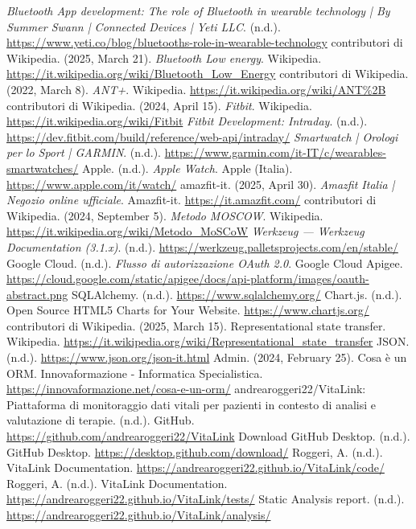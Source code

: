 \documentclass[12pt,a4paper,oneside]{report}
\begin{document}
\begin{thebibliography}{99}
     \textit{Bluetooth App development: The role of Bluetooth in wearable technology | By Summer Swann | Connected Devices | Yeti LLC}. (n.d.). \url{https://www.yeti.co/blog/bluetooths-role-in-wearable-technology}
     contributori di Wikipedia. (2025, March 21). \textit{Bluetooth Low energy}. Wikipedia. \url{https://it.wikipedia.org/wiki/Bluetooth_Low_Energy}
     contributori di Wikipedia. (2022, March 8). \textit{ANT+}. Wikipedia. \url{https://it.wikipedia.org/wiki/ANT%2B}
     contributori di Wikipedia. (2024, April 15). \textit{Fitbit}. Wikipedia. \url{https://it.wikipedia.org/wiki/Fitbit}
     \textit{Fitbit Development: Intraday}. (n.d.). \url{https://dev.fitbit.com/build/reference/web-api/intraday/}
     \textit{Smartwatch | Orologi per lo Sport | GARMIN}. (n.d.). \url{https://www.garmin.com/it-IT/c/wearables-smartwatches/}
     Apple. (n.d.). \textit{Apple Watch}. Apple (Italia). \url{https://www.apple.com/it/watch/}
     amazfit-it. (2025, April 30). \textit{Amazfit Italia | Negozio online ufficiale}. Amazfit-it. \url{https://it.amazfit.com/}
     contributori di Wikipedia. (2024, September 5). \textit{Metodo MOSCOW}. Wikipedia. \url{https://it.wikipedia.org/wiki/Metodo_MoSCoW}
     \textit{Werkzeug — Werkzeug Documentation (3.1.x)}. (n.d.). \url{https://werkzeug.palletsprojects.com/en/stable/}
     Google Cloud. (n.d.). \textit{Flusso di autorizzazione OAuth 2.0}. Google Cloud Apigee. \url{https://cloud.google.com/static/apigee/docs/api-platform/images/oauth-abstract.png}
     SQLAlchemy. (n.d.). \url{https://www.sqlalchemy.org/}
     Chart.js. (n.d.). Open Source HTML5 Charts for Your Website. \url{https://www.chartjs.org/}
     contributori di Wikipedia. (2025, March 15). Representational state transfer. Wikipedia. \url{https://it.wikipedia.org/wiki/Representational_state_transfer}
     JSON. (n.d.). \url{https://www.json.org/json-it.html}
     Admin. (2024, February 25). Cosa è un ORM. Innovaformazione - Informatica Specialistica. \url{https://innovaformazione.net/cosa-e-un-orm/}
     andrearoggeri22/VitaLink: Piattaforma di monitoraggio dati vitali per pazienti in contesto di analisi e valutazione di terapie. (n.d.). GitHub. \url{https://github.com/andrearoggeri22/VitaLink}
     Download GitHub Desktop. (n.d.). GitHub Desktop. \url{https://desktop.github.com/download/}
     Roggeri, A. (n.d.). VitaLink Documentation. \url{https://andrearoggeri22.github.io/VitaLink/code/}
     Roggeri, A. (n.d.). VitaLink Documentation. \url{https://andrearoggeri22.github.io/VitaLink/tests/}
     Static Analysis report. (n.d.). \url{https://andrearoggeri22.github.io/VitaLink/analysis/}
\end{thebibliography}
\end{document}
